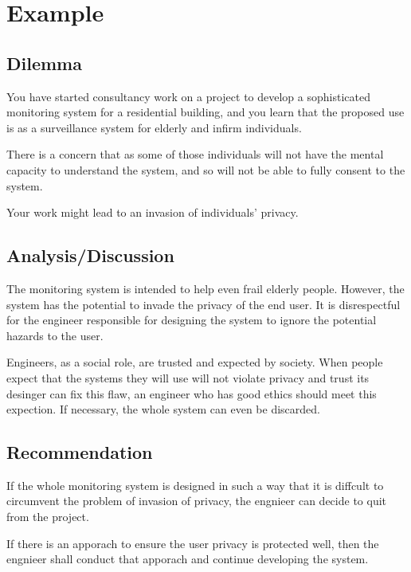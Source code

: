 \documentclass[12pt, a4paper]{article}
\begin{document}
\section{Example \MakeUppercase{}}
\subsection*{Dilemma}
You have started consultancy work on a project to develop a sophisticated monitoring system for a residential building, and you learn that the proposed use is as a surveillance system for elderly and infirm individuals.

There is a concern that as some of those individuals will not have the mental capacity to understand the system, and so will not be able to fully consent to the system.

Your work might lead to an invasion of individuals' privacy.

\subsection*{Analysis/Discussion}
The monitoring system is intended to help even frail elderly people. However, the system has the potential to invade the privacy of the end user. It is disrespectful for the engineer responsible for designing the system to ignore the potential hazards to the user.

Engineers, as a social role, are trusted and expected by society. When people expect that the systems they will use will not violate privacy and trust its desinger can fix this flaw, an engineer who has good ethics should meet this expection. If necessary, the whole system can even be discarded.

\subsection*{Recommendation}
If the whole monitoring system is designed in such a way that it is diffcult to circumvent the problem of invasion of privacy, the engnieer can decide to quit from the project.

If there is an apporach to ensure the user privacy is protected well, then the engnieer shall conduct that apporach and continue developing the system.
\end{document}
